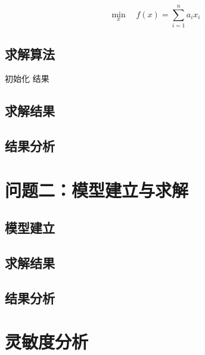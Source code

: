 \begin{equation}
  \min_{x} \quad f(x) = \sum_{i=1}^{n} a_i x_i
  \label{eq:model1}
\end{equation}

\subsection{求解算法}
\begin{algorithm}[H]
  \caption{算法名称}
  初始化\;
  \Return 结果\;
\end{algorithm}

\subsection{求解结果}

\subsection{结果分析}

\section{问题二：模型建立与求解}

\subsection{模型建立}

\subsection{求解结果}

\subsection{结果分析}

\section{灵敏度分析}

